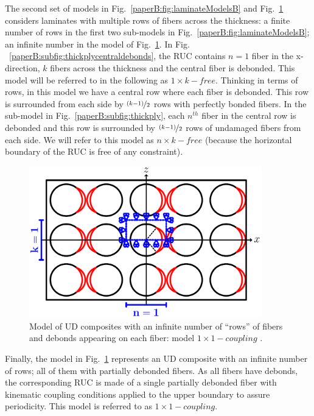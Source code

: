 The second set of models in Fig.~\ref{paperB:fig:laminateModelsB} and Fig.~\ref{paperB:fig:thickplyalldebonds} considers laminates with multiple rows of fibers across the thickness: a finite number of rows in the first two sub-models in Fig.~\ref{paperB:fig:laminateModelsB}; an infinite number in the model of Fig.~\ref{paperB:fig:thickplyalldebonds}. In Fig. ~\ref{paperB:subfig:thickplycentraldebonds}, the RUC contains $n=1$ fiber in the x-direction, $k$ fibers across the thickness and the central fiber is debonded. This model will be referred to in the following as $1\times k-free$. Thinking in terms of rows, in this model we have a central row where each fiber is debonded. This row is surrounded from each side by $\nicefrac{\left(k-1\right)}{2}$ rows with perfectly bonded fibers. In the sub-model in Fig.~\ref{paperB:subfig:thickply}, each $n^{th}$ fiber in the central row is debonded and this row is surrounded by $\nicefrac{\left(k-1\right)}{2}$ rows of undamaged fibers from each side. We will refer to this model as $n\times k-free$ (because the horizontal boundary of the RUC is free of any constraint).

\begin{figure}[!h]
\centering
\includegraphics[width=0.9\textwidth]{paperB/thickPlyAllDebonds.pdf}
\caption{Model of UD composites with an infinite number of  ``rows'' of fibers and debonds appearing on each fiber: model $1\times1-coupling$ .}\label{paperB:fig:thickplyalldebonds}
\end{figure}

Finally, the model in Fig.~\ref{paperB:fig:thickplyalldebonds} represents an UD composite with an infinite number of rows; all of them with partially debonded fibers. As all fibers have debonds, the corresponding RUC is made of a single partially debonded fiber with kinematic coupling conditions applied to the upper boundary to assure periodicity. This model is referred to as $1\times 1-coupling$.

